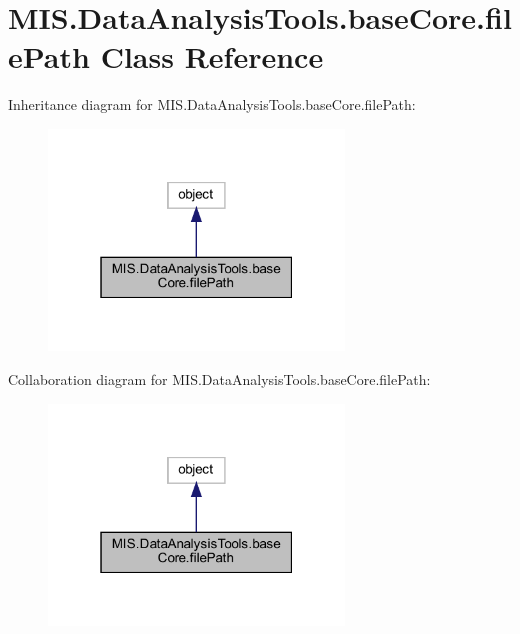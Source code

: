 \hypertarget{classMIS_1_1DataAnalysisTools_1_1baseCore_1_1filePath}{}\section{M\+I\+S.\+Data\+Analysis\+Tools.\+base\+Core.\+file\+Path Class Reference}
\label{classMIS_1_1DataAnalysisTools_1_1baseCore_1_1filePath}


Inheritance diagram for M\+I\+S.\+Data\+Analysis\+Tools.\+base\+Core.\+file\+Path\+:\nopagebreak
\begin{figure}[H]
\begin{center}
\leavevmode
\includegraphics[width=223pt]{classMIS_1_1DataAnalysisTools_1_1baseCore_1_1filePath__inherit__graph}
\end{center}
\end{figure}


Collaboration diagram for M\+I\+S.\+Data\+Analysis\+Tools.\+base\+Core.\+file\+Path\+:\nopagebreak
\begin{figure}[H]
\begin{center}
\leavevmode
\includegraphics[width=223pt]{classMIS_1_1DataAnalysisTools_1_1baseCore_1_1filePath__coll__graph}
\end{center}
\end{figure}
